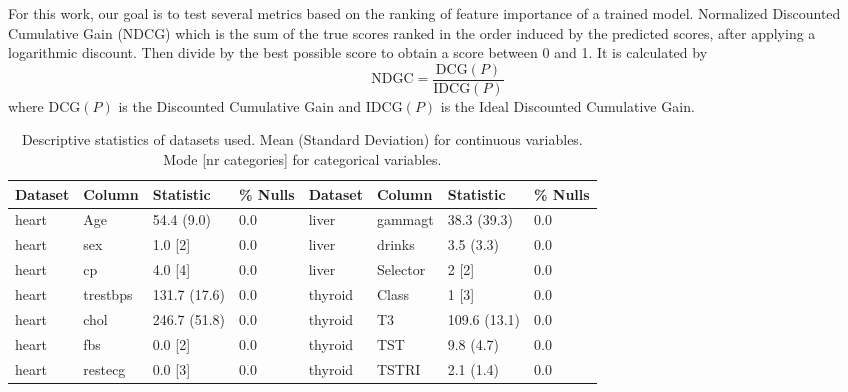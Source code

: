 
For this work, our goal is to test several metrics based on the ranking of feature importance of a trained model. Normalized Discounted Cumulative Gain (NDCG) \cite{wangTheoreticalAnalysisNDCG} which is the sum of the true scores ranked in the order induced by the predicted scores, after applying a logarithmic discount. Then divide by the best possible score to obtain a score between 0 and 1. It is calculated by
\[
\text{{NDGC}} = \frac{{\text{{DCG}}(P)}}{{\text{{IDCG}}(P)}}
\]
where $\text{{DCG}}(P)$ is the Discounted Cumulative Gain and $\text{{IDCG}}(P)$ is the Ideal Discounted Cumulative Gain. 

\begin{small}    
    \begin{table}[H]
        \footnotesize
            \caption{Descriptive statistics of datasets used. Mean (Standard Deviation) for continuous variables. Mode [nr categories] for categorical variables.}\label{tab:descrptive_feature}
                \begin{tabularx}{\textwidth}{lXll|lXll}
                    \toprule
                Dataset & Column                         & Statistic    & \% Nulls & Dataset & Column          & Statistic    & \% Nulls \\
                \midrule
                heart   & Age                            & 54.4 (9.0)   & 0.0      & liver   & gammagt         & 38.3 (39.3)  & 0.0      \\
                heart   & sex                            & 1.0 {[}2{]}  & 0.0      & liver   & drinks          & 3.5 (3.3)    & 0.0      \\
                heart   & cp                             & 4.0 {[}4{]}  & 0.0      & liver   & Selector        & 2 {[}2{]}    & 0.0      \\
                heart   & trestbps                       & 131.7 (17.6) & 0.0      & thyroid & Class           & 1 {[}3{]}    & 0.0      \\
                heart   & chol                           & 246.7 (51.8) & 0.0      & thyroid & T3              & 109.6 (13.1) & 0.0      \\
                heart   & fbs                            & 0.0 {[}2{]}  & 0.0      & thyroid & TST             & 9.8 (4.7)    & 0.0      \\
                heart   & restecg                        & 0.0 {[}3{]}  & 0.0      & thyroid & TSTRI           & 2.1 (1.4)    & 0.0      \\

\end{tabularx}
\end{table}
\end{small}
